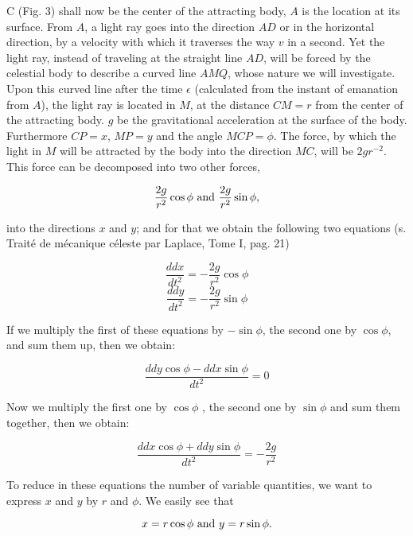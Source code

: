 \documentclass{article}
\begin{document}
C (Fig. 3) shall now be the center of the attracting body, $A$ is the location at its surface. From $A$, a light ray goes into the direction $AD$ or in the horizontal direction, by a velocity with which it traverses the way $v$ in a second. Yet the light ray, instead of traveling at the straight line $AD$, will be forced by the celestial body to describe a curved line $AMQ$, whose nature we will investigate. Upon this curved line after the time $\epsilon$ (calculated from the instant of emanation from $A$), the light ray is located in $M$, at the distance $CM = r$ from the center of the attracting body. $g$ be the gravitational acceleration at the surface of the body. Furthermore $CP = x$, $MP = y$ and the angle $MCP = \phi$. The force, by which the light in $M$ will be attracted by the body into the direction $MC$, will be $2gr^{-2}$. This force can be decomposed into two other forces,

$$
  \frac{2g}{r^{2}} \cos \phi \textnormal{ and } \frac{2g}{r^{2}} \sin\phi ,
$$

into the directions $x$ and $y$; and for that we obtain the following two equations (s. Traité de mécanique céleste par Laplace, Tome I, pag. 21)

\begin{equation}
  \frac{ddx}{dt^{2}} = -\frac{2g}{r^{2}} \cos\phi
\end{equation}
\begin{equation}
  \frac{ddy}{dt^{2}} = -\frac {2g}{r^{2}} \sin\phi
\end{equation}

If we multiply the first of these equations by $-\sin\phi$, the second one by $\cos\phi$, and sum them up, then we obtain:

\begin{equation}
  \frac{ddy\cos\phi - ddx\sin\phi}{dt^{2}} = 0
\end{equation}

Now we multiply the first one by $\cos\phi$ , the second one by $\sin\phi$ and sum them together, then we obtain:

\begin{equation}
  \frac{ddx\cos\phi + ddy\sin\phi }{dt^{2}}=-\frac{2g}{r^{2}}
\end{equation}

To reduce in these equations the number of variable quantities, we want to express $x$ and $y$ by $r$ and $\phi$. We easily see that

$$
  x = r \cos\phi \textnormal{ and } y = r \sin\phi \textnormal{.}
$$
\end{document}
